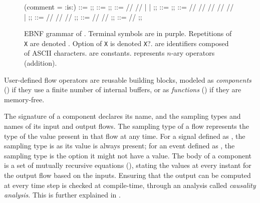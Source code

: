 \begin{figure}[!ht]
    \centering
    \begin{bnf}(comment = {:is:})
        \FunItem ::= \funItem{\ID}{\many{(\ID \: \kft{:} \: \TY)}}{\TY}{\many{\Decl}} ;;
        \CompItem ::= \compItem{\ID}{\many{(\ID \: \kft{:} \: \STY)}}{\many{(\ID \: \kft{:} \: \STY)}}{\many{\Eq}} ;;
        \Eq ::= \Decl //  // \initEq{\ID}{\CST}
        | \matchX{\Expr}{\many{(\normBr{\gPat{\Pat}{\Expr}}{\setEq})}}
        | \whenEq{\initBr{\many{(\ID \: \kfm{=} \: \CST\kft{;})}}}{\many{(\normBr{\gPat{\EPat}{\Expr}}{\setEq})}} ;;
        \Decl ::= \declEq{\many{(\ID \: \kft{:} \: \STY)}}{\Expr} ;;
        \Expr ::= \CST // \ID // \lastExpr{\ID} // \emitExpr{\Expr} // \opExpr{\many{\Expr}} // \appExpr{\ID}{\many{\Expr}}
        | \matchX{\Expr}{\many{(\normBr{\gPat{\Pat}{\Expr}}{\Expr})}} ;;
        \Pat ::= \CST // \ID // \kft{\_} // \tuple{\Pat} ;;
        \EPat ::= \ID \kfm{=} \opt{\ID} // \Expr // \tuple{\EPat} ;;
        \STY ::= \TY // \opt{\TY} ;;
    \end{bnf}
    \caption[EBNF grammar of \GRSync.]%
    {EBNF grammar of \GRSync.
        Terminal symbols are in purple.
        Repetitions of \texttt{X} are denoted .
        Option of \texttt{X} is denoted \texttt{X}?.
        \ID are identifiers composed of ASCII characters.
        \CST are constants.
        \OP represents $n$-ary operators (\eg addition).}
    \label{fig:syntax:grsync}
\end{figure}

User-defined flow operators are reusable building blocks, modeled as \emph{components} (\CompItem)
if they use a finite number of internal buffers, or as \emph{functions} (\FunItem) if they are
memory-free.

The signature of a component declares its name, and the sampling types and names of its input and
output flows.
%
The sampling type of a flow represents the type of the value present in that flow at any time.
For a signal \ID defined as \typed{\signalKind}{\ID}{\TY}, the sampling type is \TY as its value is
always present; for an event \ID defined as \typed{\eventKind}{\ID}{\TY}, the sampling type is the
option \opt{\TY} it might not have a value.
%
The body of a component is a set of mutually recursive equations (\setEq), stating the values
at every instant for the output flow based on the inputs. Ensuring that the output can be computed
at every time step is checked at compile-time, through an analysis called \emph{causality analysis}.
This is further explained in .

